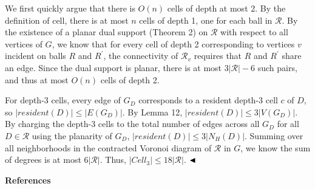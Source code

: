 We first quickly argue that there is $O(n)$ cells of depth at most 2. By the definition of cell, there is at most $n$ cells of depth 1, one for each ball in $\mathcal{R}$. By the existence of a planar dual support (Theorem 2) on $\mathcal{R}$ with respect to all vertices of $G$, we know that for every cell of depth 2 corresponding to vertices $v$ incident on balls $R$ and $R^{\prime}$, the connectivity of $\mathcal{R}_{v}$ requires that $R$ and $R^{\prime}$ share an edge. Since the dual support is planar, there is at most $3|\mathcal{R}|-6$ such pairs, and thus at most $O(n)$ cells of depth 2.
\par
\par
For depth-3 cells, every edge of $G_{D}$ corresponds to a resident depth-3 cell $c$ of $D$, so $|\mathit{resident}(D)|\leq|E(G_{D})|$. By Lemma 12, $|\mathit{resident}(D)|\leq 3|V(G_{D})|$. By charging the depth-3 cells to the total number of edges across all $G_{D}$ for all $D\in\mathcal{R}$ using the planarity of $G_{D}$, $|\mathit{resident}(D)|\leq 3|N_{H}(D)|$. Summing over all neighborhoods in the contracted Voronoi diagram of $\mathcal{R}$ in $G$, we know the sum of degrees is at most $6|\mathcal{R}|$. Thus, $|\mathit{Cell}_{3}|\leq 18|\mathcal{R}|$. $\hfill\blacktriangleleft$
\par
\par
\par\medskip\noindent\textbf{References}\par
